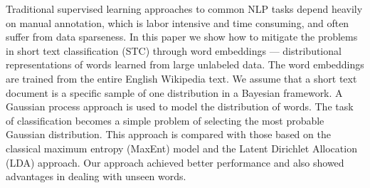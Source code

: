 Traditional supervised learning approaches to common NLP tasks depend heavily on manual annotation, which is labor intensive and time consuming, and often suffer from data sparseness. In this paper we show how to mitigate the problems in short text classification (STC) through word embeddings --- distributional representations of words learned from large unlabeled data. The word embeddings are trained from the entire English Wikipedia text. We assume that a short text document is a specific sample of one distribution in a Bayesian framework. A Gaussian process approach is used to model the distribution of words. The task of classification becomes a simple problem of selecting the most probable Gaussian distribution. This approach is compared with those based on the classical maximum entropy (MaxEnt) model and the Latent Dirichlet Allocation (LDA) approach. Our approach achieved better performance and also showed advantages in dealing with unseen words.
